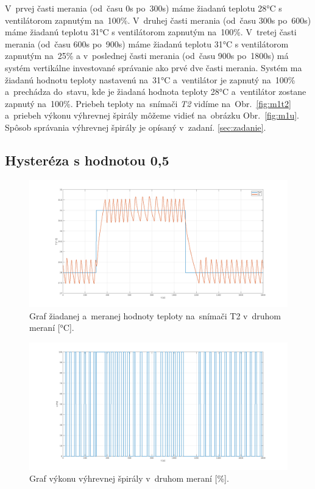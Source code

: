 \documentclass{article}
\begin{document}
V~prvej časti merania (od~času 0s po~300s) máme žiadanú teplotu 28°C s ventilátorom zapnutým na~100\%.
V~druhej časti merania (od~času 300s po~600s) máme žiadanú teplotu 31°C s ventilátorom zapnutým na~100\%.
V~tretej časti merania (od~času 600s po~900s) máme žiadanú teplotu 31°C s ventilátorom zapnutým na~25\% a
v~poslednej časti merania (od~času 900s po~1800s) má systém vertikálne investované správanie ako prvé
dve časti merania. Systém ma žiadanú hodnotu teploty nastavenú na~31°C a~ventilátor je zapnutý na~100\%
a~prechádza do~stavu, kde je žiadaná hodnota teploty 28°C a~ventilátor zostane zapnutý na~100\%.
Priebeh teploty na~snímači \textit{T2} vidíme na~Obr.~\ref{fig:m1t2} a~priebeh výkonu výhrevnej špirály
môžeme vidieť na~obrázku Obr.~\ref{fig:m1u}. Spôsob správania výhrevnej špirály je opísaný v~zadaní.
\ref{sec:zadanie}.

\clearpage

\subsection{Hysteréza s hodnotou 0,5}
\label{sec:meranie2}

\begin{figure}[!htbp]
	\begin{center}
		\includegraphics[width=\textwidth]{./include/m2T2.png}
	\end{center}
	\caption{Graf žiadanej a~meranej hodnoty teploty na~snímači T2 v~druhom meraní [°C].}
	\label{fig:m2t2}
\end{figure}

\clearpage

\begin{figure}[!htbp]
	\begin{center}
		\includegraphics[width=\textwidth]{./include/m2u.png}
	\end{center}
	\caption{Graf výkonu výhrevnej špirály v~druhom meraní [\%].}
	\label{fig:m2u}
\end{figure}
\end{document}
